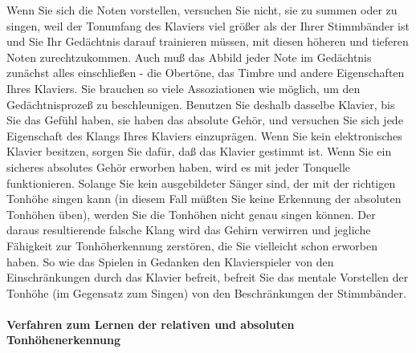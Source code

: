 Wenn Sie sich die Noten vorstellen, versuchen Sie nicht, sie zu summen oder zu singen, weil der Tonumfang des Klaviers viel größer als der Ihrer Stimmbänder ist und Sie Ihr Gedächtnis darauf trainieren müssen, mit diesen höheren und tieferen Noten zurechtzukommen.
Auch muß das Abbild jeder Note im Gedächtnis zunächst alles einschließen - die Obertöne, das Timbre und andere Eigenschaften Ihres Klaviers.
Sie brauchen so viele Assoziationen wie möglich, um den Gedächtnisprozeß zu beschleunigen.
Benutzen Sie deshalb dasselbe Klavier, bis Sie das Gefühl haben, sie haben das absolute Gehör, und versuchen Sie sich jede Eigenschaft des Klangs Ihres Klaviers einzuprägen.
Wenn Sie kein elektronisches Klavier besitzen, sorgen Sie dafür, daß das Klavier gestimmt ist.
Wenn Sie ein sicheres absolutes Gehör erworben haben, wird es mit jeder Tonquelle funktionieren.
Solange Sie kein ausgebildeter Sänger sind, der mit der richtigen Tonhöhe singen kann (in diesem Fall müßten Sie keine Erkennung der absoluten Tonhöhen üben), werden Sie die Tonhöhen nicht genau singen können.
Der daraus resultierende falsche Klang wird das Gehirn verwirren und jegliche Fähigkeit zur Tonhöherkennung zerstören, die Sie vielleicht schon erworben haben.
So wie das Spielen in Gedanken den Klavierspieler von den Einschränkungen durch das Klavier befreit, befreit Sie das mentale Vorstellen der Tonhöhe (im Gegensatz zum Singen) von den Beschränkungen der Stimmbänder.


\paragraph{Verfahren zum Lernen der relativen und absoluten Tonhöhenerkennung}
\label{c1iii12tonhoehe}

